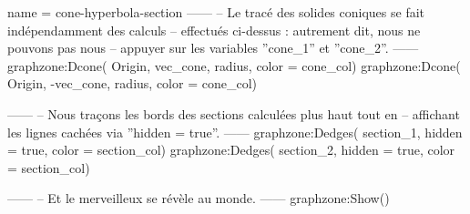 \documentclass[varwidth, border = 3pt]{standalone}
\begin{document}
\begin{luadraw}{name = cone-hyperbola-section}
------
-- Le tracé des solides coniques se fait indépendamment des calculs
-- effectués ci-dessus : autrement dit, nous ne pouvons pas nous
-- appuyer sur les variables ''cone_1'' et ''cone_2''.
------
    graphzone:Dcone(
        Origin, vec_cone, radius,
        {color = cone_col})
    graphzone:Dcone(
        Origin, -vec_cone, radius,
        {color = cone_col})

------
-- Nous traçons les bords des sections calculées plus haut tout en
-- affichant les lignes cachées via ''hidden = true''.
------
    graphzone:Dedges(
        section_1,
        {hidden = true, color = section_col})
    graphzone:Dedges(
        section_2,
        {hidden = true, color = section_col})

------
-- Et le merveilleux se révèle au monde.
------
    graphzone:Show()
\end{luadraw}
\end{document}

